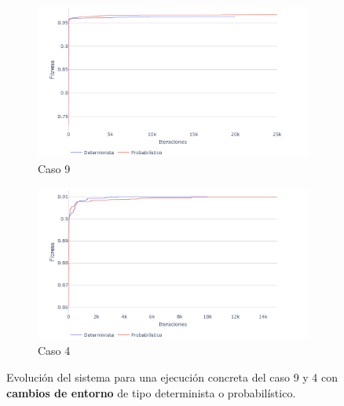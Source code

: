 \begin{figure}
	\begin{subfigure}{\linewidth}
		\centering
		\includegraphics[width=1\linewidth]{capitulos/Capitulo5-Resultados-experimentales/recursos/Caso9_determinista-vs-probabilistico_iteracion}
		\caption{Caso 9}
		\label{fig:caso9determinista-vs-probabilisticoiteracion}
	\end{subfigure}

	\begin{subfigure}{\linewidth}
		\centering
		\includegraphics[width=1\linewidth]{capitulos/Capitulo5-Resultados-experimentales/recursos/Caso4_determinista-vs-probabilistico_iteracion}
		\caption{Caso 4}
		\label{fig:caso4determinista-vs-probabilisticoiteracion}
	\end{subfigure}
	\caption{Evolución del sistema para una ejecución concreta del caso 9 y 4 con \textbf{cambios de entorno} de tipo determinista o probabilístico.}
	\label{fig:caso4y9determinista-vs-probabilisticoiteracion}
\end{figure}



